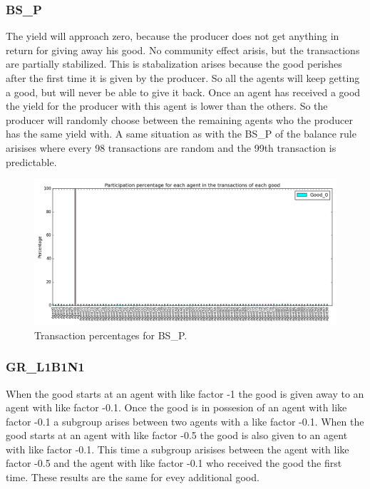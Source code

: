 \documentclass[twoside,openright]{uva-bachelor-thesis}
\begin{document}
\subsubsection{BS\_P}
The yield will approach zero, because the producer does not get anything in return for giving away his good. No community effect arisis, but the transactions are partially stabilized. This is stabalization arises because the good perishes after the first time it is given by the producer. So all the agents will keep getting a good, but will never be able to give it back. Once an agent has received a good the yield for the producer with this agent is lower than the others. So the producer will randomly choose between the remaining agents who the producer has the same yield with. A same situation as with the BS\_P of the balance rule arisises where every 98 transactions are random and the 99th transaction is predictable.
\begin{figure}[h!]
  \centering
    \includegraphics[scale=0.4]{Simulation_figures/GR_BS_P/Figure1_10k}
  \caption{Transaction percentages for BS\_P.}
\end{figure}


\subsubsection{GR\_L1B1N1}
When the good starts at an agent with like factor -1 the good is given away to an agent with like factor -0.1. Once the good is in possesion of an agent with like factor -0.1 a subgroup arises between two agents with a like factor -0.1. When the good starts at an agent with like factor -0.5 the good is also given to an agent with like factor -0.1. This time a subgroup arisises between the agent with like factor -0.5 and the agent with like factor -0.1 who received the good the first time. These results are the same for evey additional good.
\end{document}
